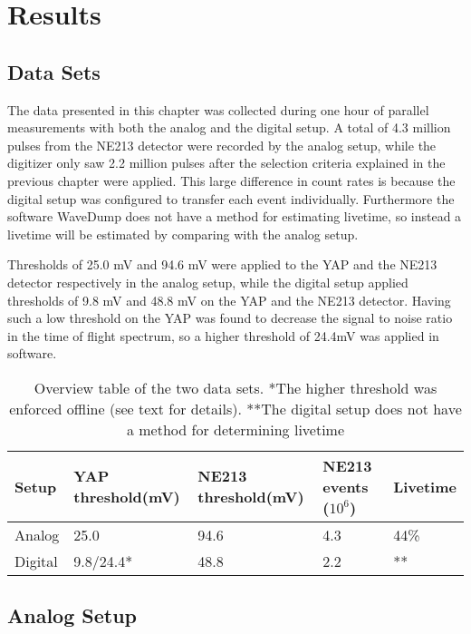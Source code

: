 \documentclass[main.tex]{subfiles}
\begin{document}
\chapter{Results}\label{ch:results}

\section{Data Sets}
The data presented in this chapter was collected during one hour of parallel measurements with both the analog and the digital setup. A total of 4.3 million pulses from the NE213 detector were recorded by the analog setup, while the digitizer only saw 2.2 million pulses after the selection criteria explained in the previous chapter were applied. This large difference in count rates is because the digital setup was configured to transfer each event individually. Furthermore the software WaveDump does not have a method for estimating livetime, so instead a livetime will be estimated by comparing with the analog setup.

Thresholds of 25.0 mV and 94.6 mV were applied to the YAP and the NE213 detector respectively in the analog setup, while the digital setup applied thresholds of 9.8 mV and 48.8 mV on the YAP and the NE213 detector. Having such a low threshold on the YAP was found to decrease the signal to noise ratio in the time of flight spectrum, so a higher threshold of 24.4\si{\milli\volt} was applied in software.
\begin{table}[bh]
\begin{tabular}{|l|l|l|l|l|}
\hline
Setup   & YAP threshold(mV) & NE213 threshold(mV) & NE213 events ($\text{10}^\text{6}$) & Livetime \\ \hline
Analog  & 25.0              & 94.6                & 4.3      & 44\%             \\ \hline
Digital & 9.8/24.4*			& 48.8                & 2.2      & **             \\ \hline
\end{tabular}
\caption[Overview table of the two data sets.]{Overview table of the two data sets. *The higher threshold was enforced offline (see text for details). **The digital setup does not have a method for determining livetime}
\label{tab:settings}
\end{table}

\section{Analog Setup}
\end{document}
